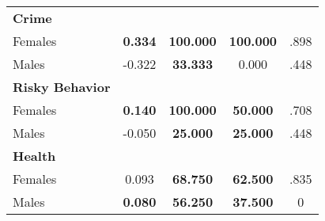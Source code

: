 \begin{tabular}{l c c c c}
\midrule
\textbf{Crime} & & & & \\
\quad Females &  \textbf{    0.334} & \textbf{  100.000} & \textbf{  100.000} & .898 \\
\quad Males &     -0.322 & \textbf{   33.333} &     0.000 & .448 \\
\midrule
\textbf{Risky Behavior} & & & & \\
\quad Females &  \textbf{    0.140} & \textbf{  100.000} & \textbf{   50.000} & .708 \\
\quad Males &     -0.050 & \textbf{   25.000} & \textbf{   25.000} & .448 \\
\midrule
\textbf{Health} & & & & \\
\quad Females &      0.093 & \textbf{   68.750} & \textbf{   62.500} & .835 \\
\quad Males &  \textbf{    0.080} & \textbf{   56.250} & \textbf{   37.500} & 0 \\
\bottomrule
\end{tabular}
